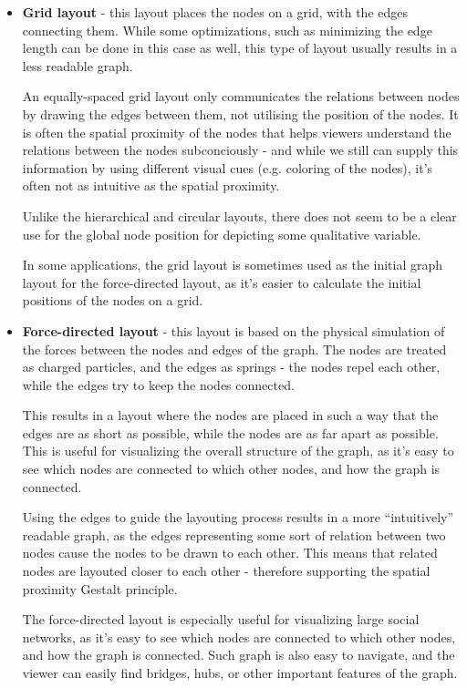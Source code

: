 \begin{itemize}
    \item \textbf{Grid layout} - this layout places the nodes on a grid, with the edges connecting them.
    While some optimizations, such as minimizing the edge length can be done in this case as well, 
    this type of layout usually results in a less readable graph.

    An equally-spaced grid layout only communicates the relations between nodes by drawing the edges between them, not utilising the position of the nodes.
    It is often the spatial proximity of the nodes that helps viewers understand the relations between the nodes subconciously - and while we still can 
    supply this information by using different visual cues (e.g. coloring of the nodes), it's often not as intuitive as the spatial proximity.

    Unlike the hierarchical and circular layouts, there does not seem to be a clear use for the global node position for depicting some qualitative variable.

    In some applications, the grid layout is sometimes used as the initial graph layout for the force-directed layout, as it's easier to calculate the initial positions of the nodes on a grid.

    \item \textbf{Force-directed layout} - this layout is based on the physical simulation of the forces between the nodes and edges of the graph.
    The nodes are treated as charged particles, and the edges as springs - the nodes repel each other, while the edges try to keep the nodes connected.
    
    This results in a layout where the nodes are placed in such a way that the edges are as short as possible, while the nodes are as far apart as possible.
    This is useful for visualizing the overall structure of the graph, as it's easy to see which nodes are connected to which other nodes, and how the graph is connected.

    Using the edges to guide the layouting process results in a more ``intuitively'' readable graph, as the edges representing some sort of relation between two nodes 
    cause the nodes to be drawn to each other. This means that related nodes are layouted closer to each other - therefore supporting the spatial proximity Gestalt principle.

    The force-directed layout is especially useful for visualizing large social networks, as it's easy to see which nodes are connected to which other nodes, and how the graph is connected.
    Such graph is also easy to navigate, and the viewer can easily find bridges, hubs, or other important features of the graph.


\end{itemize}

